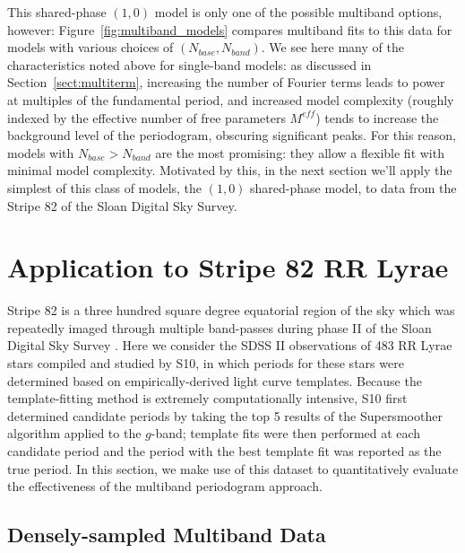 \documentclass{emulateapj}
\newcommand{\Fig}[1]{Figure~\ref{fig:#1}}
\newcommand{\fig}[1]{\Fig{#1}}
\newcommand{\Sect}[1]{Section~\ref{sect:#1}}
\newcommand{\sect}[1]{\Sect{#1}}
\newcommand{\sectlabel}[1]{\label{sect:#1}}
\begin{document}
This shared-phase $(1,0)$ model is only one of the possible multiband options, however: \fig{multiband_models} compares multiband fits to this data for models with various choices of $(N_{base},N_{band})$.
We see here many of the characteristics noted above for single-band models: as discussed in \sect{multiterm}, increasing the number of Fourier terms leads to power at multiples of the fundamental period, and increased model complexity (roughly indexed by the effective number of free parameters $M^{eff}$) tends to increase the background level of the periodogram, obscuring significant peaks.
For this reason, models with $N_{base} > N_{band}$ are the most promising: they allow a flexible fit with minimal model complexity. Motivated by this, in the next section we'll apply the simplest of this class of models, the $(1, 0)$ shared-phase model, to data from the Stripe 82 of the Sloan Digital Sky Survey.


\section{Application to Stripe 82 RR Lyrae}
\sectlabel{stripe82}
Stripe 82 is a three hundred square degree equatorial region of the sky which was repeatedly imaged through multiple band-passes during phase II of the Sloan Digital Sky Survey \citep[SDSS II, see][]{Sesar2007}.
Here we consider the SDSS II observations of 483 RR Lyrae stars compiled and studied by S10, in which periods for these stars were determined based on empirically-derived light curve templates.
Because the template-fitting method is extremely computationally intensive, S10 first determined candidate periods by taking the top 5 results of the Supersmoother \citep{Reimann94} algorithm applied to the $g$-band; template fits were then performed at each candidate period and the period with the best template fit was reported as the true period. In this section, we make use of this dataset to quantitatively evaluate the effectiveness of the multiband periodogram approach.

\subsection{Densely-sampled Multiband Data}
\end{document}

